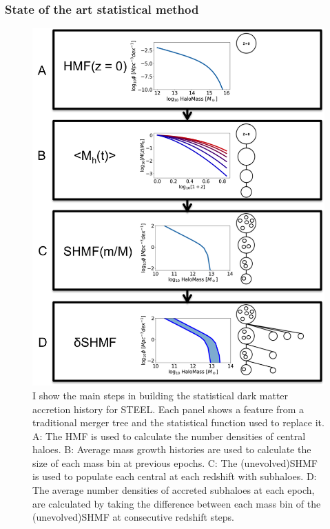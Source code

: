 



\subsubsection{State of the art statistical method}
\begin{figure}[h]
	\centering
	\includegraphics[width = \linewidth]{Figures/Chapter2/StatDM.png}
    \caption{I show the main steps in building the statistical dark matter accretion history for STEEL. Each panel shows a feature from a traditional merger tree and the statistical function used to replace it. A: The HMF is used to calculate the number densities of central haloes. B: Average mass growth histories are used to calculate the size of each mass bin at previous epochs. C: The (unevolved)SHMF is used to populate each central at each redshift with subhaloes. D: The average number densities of accreted subhaloes at each epoch, are calculated by taking the difference between each mass bin of the (unevolved)SHMF at consecutive redshift steps.}
	\label{fig:StatDM}
\end{figure}

